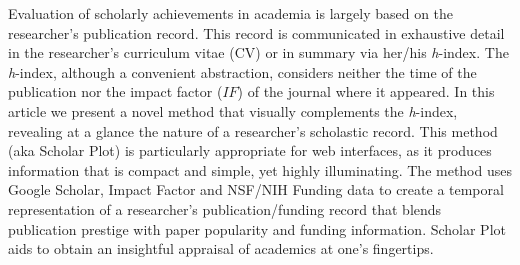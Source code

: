 Evaluation of scholarly achievements in academia is largely based on the researcher's publication record. This record is communicated in exhaustive detail in the researcher's curriculum vitae (CV) or in summary via her/his {\it h}-index. The {\it h}-index, although a convenient abstraction, considers neither the time of the publication nor the impact factor ($IF$) of the journal where it appeared. In this article we present a novel method that visually complements the {\it h}-index, revealing at a glance the nature of a researcher's scholastic record. This method (aka Scholar Plot) is particularly appropriate for web interfaces, as it produces information that is compact and simple, yet highly illuminating. The method uses Google Scholar, Impact Factor and NSF/NIH Funding data to create a temporal representation of a researcher's publication/funding record that blends publication prestige with paper popularity and funding information. Scholar Plot aids to obtain an insightful appraisal of academics at one's fingertips.



